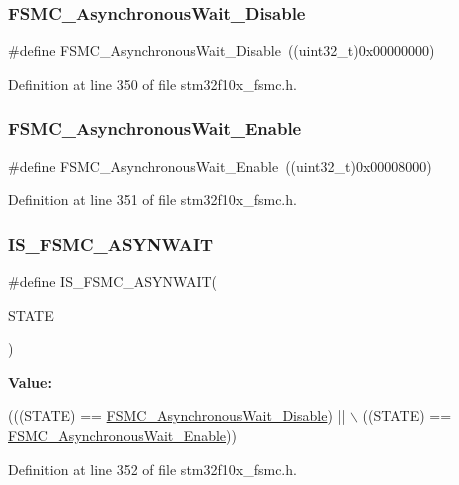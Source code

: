 \subsubsection{\texorpdfstring{F\+S\+M\+C\+\_\+\+Asynchronous\+Wait\+\_\+\+Disable}{FSMC\_AsynchronousWait\_Disable}}
{\footnotesize\ttfamily \#define F\+S\+M\+C\+\_\+\+Asynchronous\+Wait\+\_\+\+Disable~((uint32\+\_\+t)0x00000000)}



Definition at line 350 of file stm32f10x\+\_\+fsmc.\+h.

\mbox{\label{group___f_s_m_c___asynchronous_wait_gaff524bfa697106ede7d4b557a5ad7d8c}} 
\subsubsection{\texorpdfstring{F\+S\+M\+C\+\_\+\+Asynchronous\+Wait\+\_\+\+Enable}{FSMC\_AsynchronousWait\_Enable}}
{\footnotesize\ttfamily \#define F\+S\+M\+C\+\_\+\+Asynchronous\+Wait\+\_\+\+Enable~((uint32\+\_\+t)0x00008000)}



Definition at line 351 of file stm32f10x\+\_\+fsmc.\+h.

\mbox{\label{group___f_s_m_c___asynchronous_wait_ga52d579de825316ee058baf11bfb749d6}} 
\subsubsection{\texorpdfstring{I\+S\+\_\+\+F\+S\+M\+C\+\_\+\+A\+S\+Y\+N\+W\+A\+IT}{IS\_FSMC\_ASYNWAIT}}
{\footnotesize\ttfamily \#define I\+S\+\_\+\+F\+S\+M\+C\+\_\+\+A\+S\+Y\+N\+W\+A\+IT(\begin{DoxyParamCaption}\item[{}]{S\+T\+A\+TE }\end{DoxyParamCaption})}

{\bfseries Value\+:}
\begin{DoxyCode}
(((STATE) == \hyperlink{group___f_s_m_c___asynchronous_wait_ga36c0dad6fe6c0e01632d3312c8f4c4cb}{FSMC\_AsynchronousWait\_Disable}) || \(\backslash\)
                                 ((STATE) == \hyperlink{group___f_s_m_c___asynchronous_wait_gaff524bfa697106ede7d4b557a5ad7d8c}{FSMC\_AsynchronousWait\_Enable}))
\end{DoxyCode}


Definition at line 352 of file stm32f10x\+\_\+fsmc.\+h.

